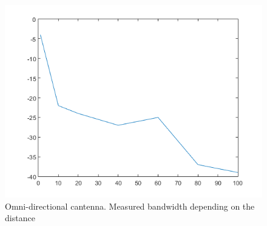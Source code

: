 \begin{figure}
	\includegraphics[width=\textwidth]{plots/omni_p.png}
	\caption{Omni-directional cantenna. Measured  bandwidth depending on the distance}
	\label{img:dist:band:omni}
\end{figure}

